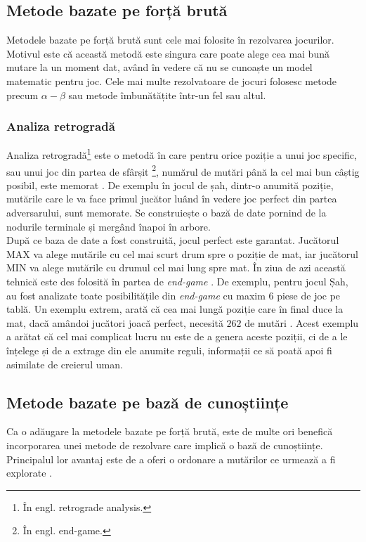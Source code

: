 \documentclass[12pt,twoside,a4paper,fleqn]{book}
\theoremstyle{definition}
\begin{document}
\subsection{Metode bazate pe forță brută}
Metodele bazate pe forță brută sunt cele mai folosite în rezolvarea jocurilor. Motivul este că această metodă este singura care poate alege cea mai bună mutare la un moment dat, având în vedere că nu se cunoaște un model matematic pentru joc. Cele mai multe rezolvatoare de jocuri folosesc metode precum $\alpha-\beta$ sau metode îmbunătățite într-un fel sau altul.

\subsubsection{Analiza retrogradă}
Analiza retrogradă\footnote{În engl. retrograde analysis.} este o metodă în care pentru orice poziție a unui joc specific, sau unui joc din partea de sfârșit \footnote{În engl. end-game.}, numărul de mutări până la cel mai bun câștig posibil, este memorat \cite{games_solved_herik}. De exemplu în jocul de șah, dintr-o anumită poziție, mutările care le va face primul jucător luând în vedere joc perfect din partea adversarului, sunt memorate. Se construiește o bază de date pornind de la nodurile terminale și mergând înapoi în arbore.\\
După ce baza de date a fost construită, jocul perfect este garantat. Jucătorul MAX va alege mutările cu cel mai scurt drum spre o poziție de mat, iar jucătorul MIN va alege mutările cu drumul cel mai lung spre mat. În ziua de azi această tehnică este des folosită în partea de \emph{end-game} \cite{games_solved_herik}. De exemplu, pentru jocul Șah, au fost analizate toate posibilitățile din \emph{end-game} cu maxim $6$ piese de joc pe tablă. Un exemplu extrem, arată că cea mai lungă poziție care în final duce la mat, dacă amândoi jucători joacă perfect, necesită $262$ de mutări \cite{games_solved_herik}. Acest exemplu a arătat că cel mai complicat lucru nu este de a genera aceste poziții, ci de a le înțelege și de a extrage din ele anumite reguli, informații ce să poată apoi fi asimilate de creierul uman.

\subsection{Metode bazate pe bază de cunoștiințe}
Ca o adăugare la metodele bazate pe forță brută, este de multe ori benefică incorporarea unei metode de rezolvare care implică o bază de cunoștiințe. Principalul lor avantaj este de a oferi o ordonare a mutărilor ce urmează a fi explorate \cite{games_solved_herik}.
\end{document}
